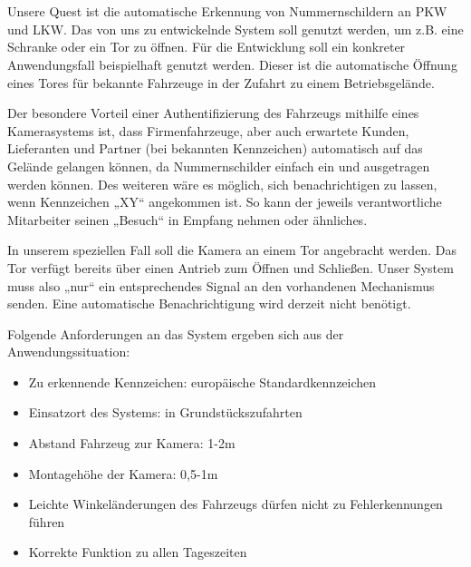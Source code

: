\documentclass{../Vorlage/sebDenCls}
\begin{document}


\section{}
Unsere Quest ist die automatische Erkennung von Nummernschildern an PKW und LKW. Das von uns zu entwickelnde System soll genutzt werden, um z.B. eine Schranke oder ein Tor zu öffnen. Für die Entwicklung soll ein konkreter Anwendungsfall beispielhaft genutzt werden. Dieser ist die automatische Öffnung eines Tores für bekannte Fahrzeuge in der Zufahrt zu einem Betriebsgelände. 

Der besondere Vorteil einer Authentifizierung des Fahrzeugs mithilfe eines Kamerasystems ist, dass Firmenfahrzeuge, aber auch erwartete Kunden, Lieferanten und Partner (bei bekannten Kennzeichen) automatisch auf das Gelände gelangen können, da Nummernschilder einfach ein und ausgetragen werden können. Des weiteren wäre es möglich, sich benachrichtigen zu lassen, wenn Kennzeichen „XY“ angekommen ist. So kann der jeweils verantwortliche Mitarbeiter seinen „Besuch“ in Empfang nehmen oder ähnliches. 

In unserem speziellen Fall soll die Kamera an einem Tor angebracht werden. Das Tor verfügt bereits über einen Antrieb zum Öffnen und Schließen. Unser System muss also „nur“ ein entsprechendes Signal an den vorhandenen Mechanismus senden. Eine automatische Benachrichtigung wird derzeit nicht benötigt. 

Folgende Anforderungen an das System ergeben sich aus der Anwendungssituation:
\begin{itemize}
\item Zu erkennende Kennzeichen: europäische Standardkennzeichen
\item Einsatzort des Systems: in Grundstückszufahrten
\item Abstand Fahrzeug zur Kamera: 1-2m
\item Montagehöhe der Kamera: 0,5-1m
\item Leichte Winkeländerungen des Fahrzeugs dürfen nicht zu Fehlerkennungen führen
\item Korrekte Funktion zu allen Tageszeiten
\end{itemize}	

\newpage
\section{}
\end{document}
